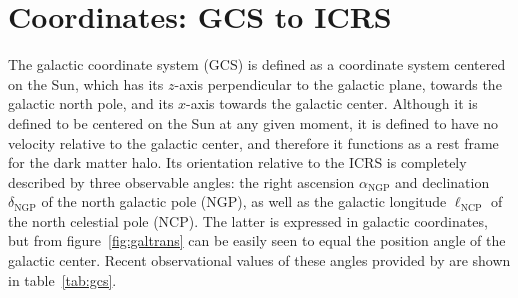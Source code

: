 \documentclass[b5paper, 10pt, twoside]{book}
\begin{document}
\section{Coordinates: GCS to ICRS}

The galactic coordinate system (GCS) is defined as a coordinate system centered on the Sun, which has its $z$-axis perpendicular to the galactic plane, towards the galactic north pole, and its $x$-axis towards the galactic center. Although it is defined to be centered on the Sun at any given moment, it is defined to have no velocity relative to the galactic center, and therefore it functions as a rest frame for the dark matter halo. Its orientation relative to the ICRS is completely described by three observable angles: the right ascension $\alpha_\text{NGP}$ and declination $\delta_\text{NGP}$ of the north galactic pole (NGP), as well as the galactic longitude $\ell_\text{NCP}$ of the north celestial pole (NCP). The latter is expressed in galactic coordinates, but from figure~\ref{fig:galtrans} can be easily seen to equal the position angle of the galactic center. Recent observational values of these angles provided by \cite{KarimMamajek2017} are shown in table~\ref{tab:gcs}.
\end{document}
